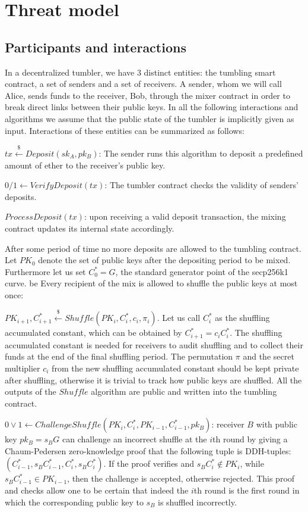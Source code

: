 \documentclass[a4paper]{article}
\theoremstyle{definition}
\begin{document}
\section{Threat model}
\subsection{Participants and interactions}
In a decentralized tumbler, we have $3$ distinct entities: the tumbling smart contract, a set of senders and a set of receivers. A sender, whom we will call Alice, sends funds to the receiver, Bob, through the mixer contract in order to break direct links between their public keys. In all the following interactions and algorithms we assume that the public state of the tumbler is implicitly given as input. Interactions of these entities can be summarized as follows: 
 
$tx\stackrel{\$}{\leftarrow}Deposit(sk_A,pk_B)$: The sender runs this algorithm to deposit a predefined amount of ether to the receiver's public key.

$0/1\leftarrow VerifyDeposit(tx)$: The tumbler contract checks the validity of senders' deposits.

$ProcessDeposit(tx)$: upon receiving a valid deposit transaction, the mixing contract updates its internal state accordingly.

After some period of time no more deposits are allowed to the tumbling contract. Let $PK_{0}$ denote the set of public keys after the depositing period to be mixed. Furthermore let us set $C^{*}_{0}=G$, the standard generator point of the secp256k1 curve. be Every recipient of the mix is allowed to shuffle the public keys at most once: 

$PK_{i+1},C_{i+1}^{*}\stackrel{\$}{\leftarrow}Shuffle(PK_{i},C^{*}_{i},c_{i},\pi_{i})$. Let us call $C^{*}_{i}$ as the shuffling accumulated constant, which can be obtained by $C^{*}_{i+1}=c_{i}C^{*}_{i}$. The shuffling accumulated constant is needed for receivers to audit shuffling and to collect their funds at the end of the final shuffling period. The permutation $\pi$ and the secret multiplier $c_{i}$ from the new shuffling accumulated constant should be kept private after shuffling, otherwise it is trivial to track how public keys are shuffled. All the outputs of the $Shuffle$ algorithm are public and written into the tumbling contract.  

$0\lor1\leftarrow 
ChallengeShuffle(PK_{i},C^{*}_{i},PK_{i-1},C^{*}_{i-1},pk_{B})$: receiver $B$ with public key $pk_{B}=s_{B}G$ can challenge an incorrect shuffle at the $i$th round by giving a Chaum-Pedersen zero-knowledge proof that the following tuple is DDH-tuples: $(C^{*}_{i-1}, s_{B}C^{*}_{i-1}, C^{*}_{i}, s_{B}C^{*}_{i})$. If the proof verifies and $s_{B}C^{*}_{i} \notin PK_{i}$, while $s_{B}C^{*}_{i-1} \in PK_{i-1}$, then the challenge is accepted, otherwise rejected. This proof and checks allow one to be certain that indeed the $i$th round is the first round in which the corresponding public key to $s_{B}$ is shuffled incorrectly.  
\end{document}
